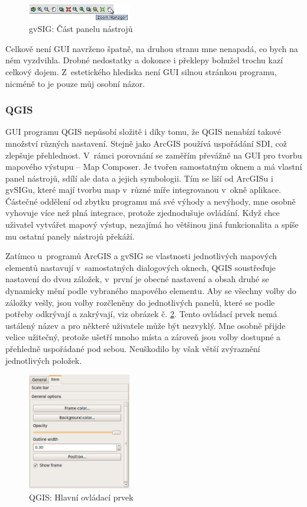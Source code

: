 \documentclass[a4paper,12pt,draft]{article}
\begin{document}
\begin{figure}[h!]
\centering
\includegraphics[width=0.4\textwidth]{./GUI_screenshots/gvSIG_toolbar.png}
\caption{gvSIG: Část panelu nástrojů}
\label{fig:gvSIG_toolbar}
\end{figure}


Celkově není GUI navrženo špatně, na druhou stranu mne
nenapadá, co bych na něm vyzdvihla. Drobné nedostatky a dokonce i překlepy
bohužel trochu kazí celkový dojem. Z~estetického hlediska není GUI
silnou stránkou programu, nicméně to je pouze můj osobní názor.

\subsubsection{QGIS}
GUI programu QGIS nepůsobí složitě i díky tomu, že QGIS
nenabízí takové množství různých nastavení. Stejně jako ArcGIS používá
uspořádání SDI, což zlepšuje pře\-hlednost. V~rámci porovnání se zaměřím převážně
na GUI pro tvorbu mapového výstupu -- Map Composer. Je tvořen
samostatným oknem a má vlastní panel ná\-strojů, sdílí ale data a jejich
symbologii. Tím se liší od ArcGISu i gvSIGu, které mají tvorbu map
v~různé míře integrovanou v~okně aplikace. Částečné oddělení od zbytku
programu má své výhody a nevýhody, mne osobně vyhovuje více než
plná integrace, protože zjednodušuje ovládání. Když chce uživatel
vytvářet mapový výstup, nezajímá ho většinou jiná funkcionalita a
spíše mu ostatní panely nástrojů překáží.

Zatímco u~programů ArcGIS a gvSIG se vlastnosti jednotlivých mapových
elementů nastavují v~samostatných dialogových oknech, QGIS soustřeďuje
nastavení do dvou záložek, v~první je obecné nastavení a obsah
druhé se dynamicky mění podle vybraného mapového elementu. Aby se
všechny volby do záložky vešly, jsou volby rozčleněny do jednotlivých
panelů, které se podle potřeby odkrývají a zakrývají, viz obrázek
č. \ref{fig:QGIS_panel}. Tento ovládací prvek nemá ustálený název
a pro některé uživatele může být nezvyklý. Mne osobně přijde
velice užitečný, protože ušetří mnoho místa a zároveň jsou volby
dostupné a přehledně uspořádané pod sebou. Neuškodilo by však větší
zvýraznění jednotlivých položek.


\begin{figure}[h!]
\centering
\includegraphics[width=0.4\textwidth]{./GUI_screenshots/QGIS_panel.png}
\caption{QGIS: Hlavní ovládací prvek}
\label{fig:QGIS_panel}
\end{figure}
\end{document}
